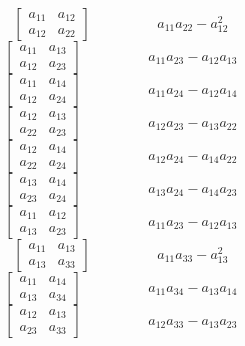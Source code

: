 
$$\left[\begin{matrix}a_{11} & a_{12}\\a_{12} & a_{22}\end{matrix}\right]\hspace{2cm} a_{11} a_{22} - a_{12}^{2}$$   
$$\left[\begin{matrix}a_{11} & a_{13}\\a_{12} & a_{23}\end{matrix}\right]\hspace{2cm} a_{11} a_{23} - a_{12} a_{13}$$   
$$\left[\begin{matrix}a_{11} & a_{14}\\a_{12} & a_{24}\end{matrix}\right]\hspace{2cm} a_{11} a_{24} - a_{12} a_{14}$$   
$$\left[\begin{matrix}a_{12} & a_{13}\\a_{22} & a_{23}\end{matrix}\right]\hspace{2cm} a_{12} a_{23} - a_{13} a_{22}$$   
$$\left[\begin{matrix}a_{12} & a_{14}\\a_{22} & a_{24}\end{matrix}\right]\hspace{2cm} a_{12} a_{24} - a_{14} a_{22}$$   
$$\left[\begin{matrix}a_{13} & a_{14}\\a_{23} & a_{24}\end{matrix}\right]\hspace{2cm} a_{13} a_{24} - a_{14} a_{23}$$   
$$\left[\begin{matrix}a_{11} & a_{12}\\a_{13} & a_{23}\end{matrix}\right]\hspace{2cm} a_{11} a_{23} - a_{12} a_{13}$$   
$$\left[\begin{matrix}a_{11} & a_{13}\\a_{13} & a_{33}\end{matrix}\right]\hspace{2cm} a_{11} a_{33} - a_{13}^{2}$$   
$$\left[\begin{matrix}a_{11} & a_{14}\\a_{13} & a_{34}\end{matrix}\right]\hspace{2cm} a_{11} a_{34} - a_{13} a_{14}$$   
$$\left[\begin{matrix}a_{12} & a_{13}\\a_{23} & a_{33}\end{matrix}\right]\hspace{2cm} a_{12} a_{33} - a_{13} a_{23}$$   
